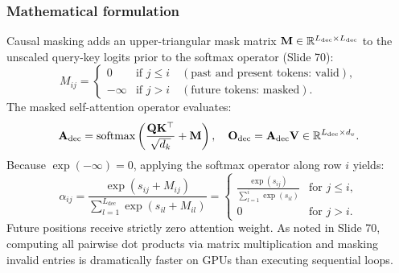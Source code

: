 \documentclass[../../../main.tex]{subfiles}
\begin{document}
\subsubsection{Mathematical formulation}
Causal masking adds an upper-triangular mask matrix $\mathbf{M} \in \mathbb{R}^{L_{\text{dec}} \times L_{\text{dec}}}$ to the unscaled query-key logits prior to the softmax operator (Slide 70):
\begin{equation}
\label{eq:causal_mask_matrix_def}
M_{ij} = \begin{cases}
0 & \text{if } j \le i \quad (\text{past and present tokens: valid}), \\
-\infty & \text{if } j > i \quad (\text{future tokens: masked}).
\end{cases}
\end{equation}
The masked self-attention operator evaluates:
\begin{equation}
\label{eq:masked_attention_formula}
\mathbf{A}_{\text{dec}} = \operatorname{\mathrm{softmax}}\left( \frac{\mathbf{Q} \mathbf{K}^\top}{\sqrt{d_k}} + \mathbf{M} \right), \quad \mathbf{O}_{\text{dec}} = \mathbf{A}_{\text{dec}} \mathbf{V} \in \mathbb{R}^{L_{\text{dec}} \times d_v}.
\end{equation}
Because $\exp(-\infty) = 0$, applying the softmax operator along row $i$ yields:
\begin{equation}
\alpha_{ij} = \frac{\exp(s_{ij} + M_{ij})}{\sum_{l=1}^{L_{\text{dec}}} \exp(s_{il} + M_{il})} = \begin{cases}
\frac{\exp(s_{ij})}{\sum_{l=1}^i \exp(s_{il})} & \text{for } j \le i, \\
0 & \text{for } j > i.
\end{cases}
\end{equation}
Future positions receive strictly zero attention weight. As noted in Slide 70, computing all pairwise dot products via matrix multiplication and masking invalid entries is dramatically faster on GPUs than executing sequential loops.
\end{document}
